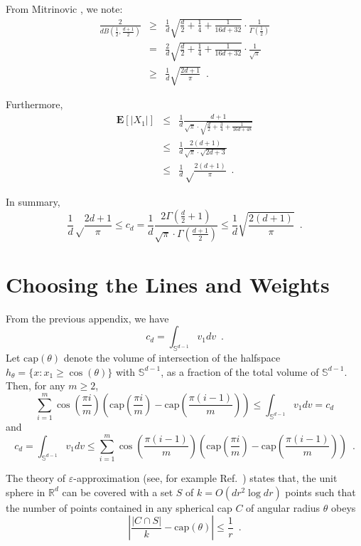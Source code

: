 \documentclass[charterfonts,lotsofwhite]{patmorin}
\newcommand{\eps}{\varepsilon}
\newcommand{\E}{\mathbf{E}}
\begin{document}
From Mitrinovic \cite[p.~286]{m70}, we note:
\begin{eqnarray}
\frac{2}{dB(\frac{1}{2},\frac{d+1}{2})} & \ge &
  \frac{1}{d}\sqrt{\frac{d}{2}+\frac{1}{4}+\frac{1}{16d+32}}\cdot 
     \frac{1}{\Gamma(\frac{1}{2})} \\
 & = & \frac{2}{d}\sqrt{\frac{d}{2}+\frac{1}{4}+\frac{1}{16d+32}}\cdot
      \frac{1}{\sqrt{\pi}} \\
 & \ge & \frac{1}{d}\sqrt{\frac{2d+1}{\pi}} \enspace .
\end{eqnarray}

Furthermore,
\begin{eqnarray*}
\E\left[|X_1|\right] 
  & \le & \frac{1}{d}\frac{d+1}{\sqrt{\pi}\cdot\sqrt{\frac{d}{2}+
                       \frac{3}{4}+\frac{1}{16d+48}}} \\
  & \le & \frac{1}{d}\frac{2(d+1)}{\sqrt{\pi}\cdot\sqrt{2d+3}} \\ 
  & \le & \frac{1}{d}\sqrt\frac{2(d+1)}{\pi} \enspace . 
\end{eqnarray*}

In summary,
\[
\frac{1}{d}\sqrt\frac{2d+1}{\pi} \le c_d = \frac{1}{d}\frac{2\Gamma(\frac{d}{2}+1)}
                            {\sqrt{\pi}\cdot\Gamma(\frac{d+1}{2})}
 \le \frac{1}{d}\sqrt{\frac{2(d+1)}{\pi}} \enspace .
\]

\section{Choosing the Lines and Weights}
\newcommand{\ccap}{\mathrm{cap}}

From the previous appendix, we have
\[
     c_d = \int_{\mathbb{S}^{d-1}} v_1 dv \enspace .
\]
Let $\ccap(\theta)$ denote the volume of intersection of the halfspace
$h_\theta=\{x : x_1\ge\cos(\theta)\}$ with $\mathbb{S}^{d-1}$, as a fraction of the total
volume of $\mathbb{S}^{d-1}$.  Then, for any $m\ge 2$,
\[
\sum_{i=1}^m \cos\left(\frac{\pi i}{m}\right)
   \left(\ccap\left(\frac{\pi i}{m}\right)
       -\ccap\left(\frac{\pi (i-1)}{m}\right)\right) \le 
\int_{\mathbb{S}^{d-1}} v_1 dv = c_d 
\]
and
\[
  c_d= \int_{\mathbb{S}^{d-1}} v_1 dv\le 
\sum_{i=1}^m \cos\left(\frac{\pi (i-1)}{m}\right)
   \left(\ccap\left(\frac{\pi i}{m}\right)
       -\ccap\left(\frac{\pi (i-1)}{m}\right)\right) 
\enspace .
\]

The theory of $\eps$-approximation (see, for example
Ref.~\cite[Chapter~4]{c00}) states that, the unit sphere in
$\mathbb{R}^d$ can be covered with a set $S$ of $k=O(dr^2\log dr)$
points such that the number of points contained in any spherical  cap
$C$ of angular radius $\theta$ obeys
\[
   \left|\frac{|C\cap S|}{k} - \ccap(\theta)\right| \le \frac{1}{r}
    \enspace .
\]
\end{document}
